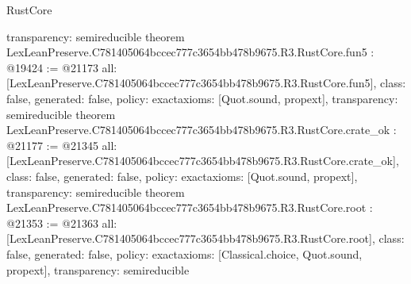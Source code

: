 \begin{lexlean}{RustCore}
\begin{coremodule}
{  transparency: semireducible
}
theorem LexLeanPreserve.C781405064bccec777c3654bb478b9675.R3.RustCore.fun5 : @19424 := @21173 {
  all: [LexLeanPreserve.C781405064bccec777c3654bb478b9675.R3.RustCore.fun5],
  class: false,
  generated: false,
  policy: exact{axioms: [Quot.sound, propext]},
  transparency: semireducible
}
theorem LexLeanPreserve.C781405064bccec777c3654bb478b9675.R3.RustCore.crate_ok : @21177 := @21345 {
  all: [LexLeanPreserve.C781405064bccec777c3654bb478b9675.R3.RustCore.crate_ok],
  class: false,
  generated: false,
  policy: exact{axioms: [Quot.sound, propext]},
  transparency: semireducible
}
theorem LexLeanPreserve.C781405064bccec777c3654bb478b9675.R3.RustCore.root : @21353 := @21363 {
  all: [LexLeanPreserve.C781405064bccec777c3654bb478b9675.R3.RustCore.root],
  class: false,
  generated: false,
  policy: exact{axioms: [Classical.choice, Quot.sound, propext]},
  transparency: semireducible
}


\end{coremodule}
\end{lexlean}
